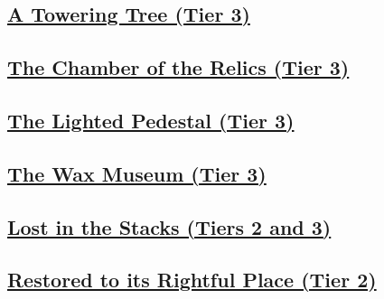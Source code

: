 \documentclass[sheet]{GL2020}
\begin{document}
\clearpage

\begin{center}\section*{\underline{A Towering Tree (Tier 3)}}\end{center}
\label{ToweringTree}

\clearpage

\begin{center}\section*{\underline{The Chamber of the Relics (Tier 3)}}\end{center}
\label{ChamberofRelics}

\clearpage

\begin{center}\section*{\underline{The Lighted Pedestal (Tier 3)}}\end{center}
\label{LightedPedestal}

\clearpage

\begin{center}\section*{\underline{The Wax Museum (Tier 3)}}\end{center}
\label{WaxMuseum}

\clearpage

\begin{center}\section*{\underline{Lost in the Stacks (Tiers 2 and 3)}}\end{center}
\label{LostintheStacks}

\clearpage

\begin{center}\section*{\underline{Restored to its Rightful Place (Tier 2)}}\end{center}
\label{RestoredRightfulPlace}
\end{document}
